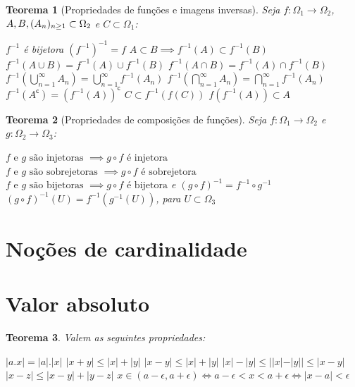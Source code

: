 \documentclass[12pt,a4paper,answers]{article}
\numberwithin{equation}{section} %
\newcommand{\cp}[1]{#1^\mathsf{c}} %
\newcommand{\inv}[1]{#1^{-1}}      %
\theoremstyle{thm_estilo}
\newtheorem{theorem}{Teorema}[section]
\theoremstyle{thm_note_est}
\begin{document}
\begin{theorem}[Propriedades de funções e imagens inversas] Seja \( f\colon\Omega_1 \to \Omega_2 \),  \(\mathmbox{A,B,(A_n)_{n\geq1} \subset \Omega_2}\) e \(C \subset \Omega_1\):
	\begin{outline}[enumerate]
		\1 $\inv{f}$ é bijetora
		\1 $\inv{\left(\inv{f}\right)} = f$
		\1 \(A \subset B \implies \inv{f}(A) \subset \inv{f}(B)\) 
		\1 \( \inv{f}(A\cup B) = \inv{f}(A)\cup \inv{f}(B) \)
		\1 \( \inv{f}(A\cap B) = \inv{f}(A)\cap \inv{f}(B) \)
		\1 \(\inv{f}\left( \bigcup_{n=1}^\infty A_n \right) = \bigcup_{n=1}^\infty \inv{f}(A_n) \)
		\1 \(\inv{f}\left( \bigcap_{n=1}^\infty A_n \right) = \bigcap_{n=1}^\infty \inv{f}(A_n) \)
		\1 \(\inv{f}(\cp{A}) = \cp{\left(\inv{f}(A)\right)} \)
		\1 \( C \subset \inv{f} \left( f(C) \right) \)
		\1 \(f\left(\inv{f}(A)\right) \subset A \)
	\end{outline}
\end{theorem}

\begin{theorem}[Propriedades de composições de funções] Seja $f\colon\Omega_1 \to \Omega_2$ e $g\colon\Omega_2 \to \Omega_3$:
	\begin{outline}[enumerate]
		\1 \( f \text{ e } g \text{ são injetoras } \implies g\circ f \text{ é injetora} \)
		\1 \( f \text{ e } g \text{ são sobrejetoras } \implies g\circ f \text{ é sobrejetora} \)
		\1 \( f \text{ e } g \text{ são bijetoras } \implies g\circ f \text{ é bijetora} \) e \( \inv{\left(g \circ f\right)} = \inv{f}\circ\inv{g}\)
		\1 \( \inv{\left(g \circ f\right)}(U) = \inv{f}(\inv{g}(U))\), para $U\subset \Omega_3$
	\end{outline}
\end{theorem}

\section{Noções de cardinalidade}

\section{Valor absoluto}

\begin{theorem}
	Valem as seguintes propriedades:
	\begin{outline}[enumerate]
		\1 \( |a.x| = |a|.|x| \)
		\1 \( |x+y| \leq |x|+|y| \)
		\1 \( |x-y| \leq |x|+|y| \)
		\1 \( |x|-|y| \leq ||x|-|y|| \leq |x-y| \)
		\1 \( |x-z| \leq |x-y| + |y-z| \)
		\1 \( x \in (a-\epsilon, a+\epsilon) \iff a-\epsilon < x < a+\epsilon \iff |x-a|<\epsilon \)
	\end{outline}
\end{theorem}
\end{document}
